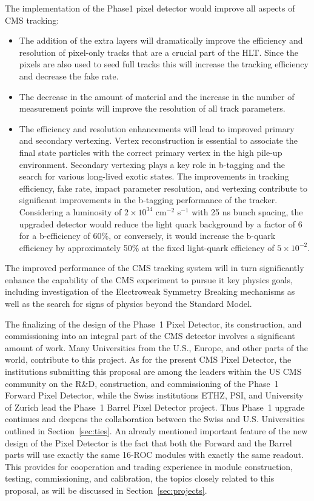 The implementation of the Phase1 pixel detector would improve all aspects of CMS tracking:
\begin{itemize}
\item The addition of the extra layers will dramatically improve the
  efficiency and resolution of pixel-only tracks that are a crucial
  part of the HLT. Since the pixels are also used to seed full tracks
  this will increase the tracking efficiency and decrease the fake
  rate.
\item The decrease in the amount of material and the increase in the
  number of measurement points will improve the resolution of all
  track parameters.
\item The efficiency and resolution enhancements will lead to improved
  primary and secondary vertexing. Vertex reconstruction is essential
  to associate the final state particles with the correct primary
  vertex in the high pile-up environment. Secondary vertexing plays a
  key role in b-tagging and the search for various long-lived exotic
  states. The improvements in tracking efficiency, fake rate, impact
  parameter resolution, and vertexing contribute to significant
  improvements in the b-tagging performance of the tracker.
  Considering a luminosity of $2 \times 10^{34}$ cm$^{-2}$ s$^{-1}$
  with 25 ns bunch spacing, the upgraded detector would reduce the
  light quark background by a factor of 6 for a b-efficiency of 60\%,
  or conversely, it would increase the b-quark efficiency by
  approximately 50\% at the fixed light-quark efficiency of $5\times
  10^{-2}$.
\end{itemize}

\noindent
The improved performance of the CMS tracking system will in turn
significantly enhance the capability of the CMS experiment to pursue
it key physics goals, including investigation of the Electroweak
Symmetry Breaking mechanisms as well as the search for signs of
physics beyond the Standard Model.

The finalizing of the design of the Phase~1 Pixel Detector, its
construction, and commissioning into an integral part of the CMS
detector involves a significant amount of work. Many Universities from
the U.S., Europe, and other parts of the world, contribute to this
project. As for the present CMS Pixel Detector, the institutions
submitting this proposal are among the leaders within the US CMS
community on the R\&D, construction, and commissioning of the Phase~1
Forward Pixel Detector, while the Swiss institutions ETHZ, PSI, and
University of Zurich lead the Phase~1 Barrel Pixel Detector project.
Thus Phase~1 upgrade continues and deepens the collaboration between
the Swiss and U.S. Universities outlined in Section~\ref{sec:ties}.
An already mentioned important feature of the new design of the Pixel
Detector is the fact that both the Forward and the Barrel parts will
use exactly the same 16-ROC modules with exactly the same readout.
This provides for cooperation and trading experience in module
construction, testing, commissioning, and calibration, the topics
closely related to this proposal, as will be discussed in
Section~\ref{sec:projects}.



